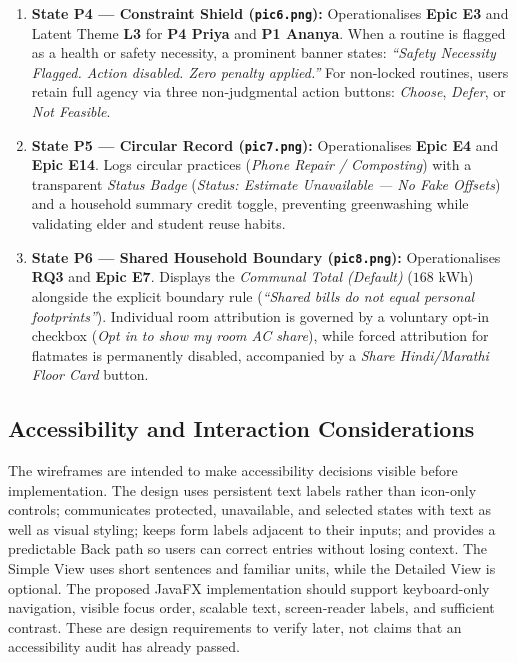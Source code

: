 \documentclass[12pt, a4paper]{article}
\begin{document}
\begin{enumerate}[leftmargin=1.8em, itemsep=0.3em]
    \item \textbf{State P4 --- Constraint Shield (\texttt{pic6.png}):} Operationalises \textbf{Epic E3} and Latent Theme \textbf{L3} for \textbf{P4 Priya} and \textbf{P1 Ananya}. When a routine is flagged as a health or safety necessity, a prominent banner states: \textit{``Safety Necessity Flagged. Action disabled. Zero penalty applied.''} For non-locked routines, users retain full agency via three non-judgmental action buttons: \textit{Choose}, \textit{Defer}, or \textit{Not Feasible}.
    \item \textbf{State P5 --- Circular Record (\texttt{pic7.png}):} Operationalises \textbf{Epic E4} and \textbf{Epic E14}. Logs circular practices (\textit{Phone Repair / Composting}) with a transparent \textit{Status Badge} (\textit{Status: Estimate Unavailable --- No Fake Offsets}) and a household summary credit toggle, preventing greenwashing while validating elder and student reuse habits.
    \item \textbf{State P6 --- Shared Household Boundary (\texttt{pic8.png}):} Operationalises \textbf{RQ3} and \textbf{Epic E7}. Displays the \textit{Communal Total (Default)} ($168\text{ kWh}$) alongside the explicit boundary rule (\textit{``Shared bills do not equal personal footprints''}). Individual room attribution is governed by a voluntary opt-in checkbox (\textit{Opt in to show my room AC share}), while forced attribution for flatmates is permanently disabled, accompanied by a \textit{Share Hindi/Marathi Floor Card} button.
\end{enumerate}


\subsection{Accessibility and Interaction Considerations}
The wireframes are intended to make accessibility decisions visible before implementation. The design uses persistent text labels rather than icon-only controls; communicates protected, unavailable, and selected states with text as well as visual styling; keeps form labels adjacent to their inputs; and provides a predictable Back path so users can correct entries without losing context. The Simple View uses short sentences and familiar units, while the Detailed View is optional. The proposed JavaFX implementation should support keyboard-only navigation, visible focus order, scalable text, screen-reader labels, and sufficient contrast. These are design requirements to verify later, not claims that an accessibility audit has already passed.
\end{document}
